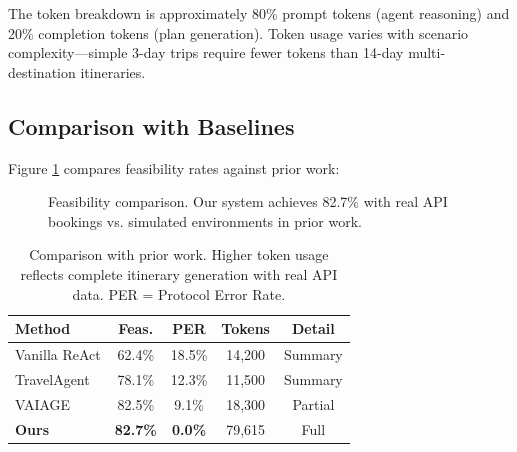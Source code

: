 \documentclass[conference]{IEEEtran}
\begin{document}
The token breakdown is approximately 80\% prompt tokens (agent reasoning) and 20\% completion tokens (plan generation). Token usage varies with scenario complexity---simple 3-day trips require fewer tokens than 14-day multi-destination itineraries.

\subsection{Comparison with Baselines}

Figure \ref{fig:feasibility} compares feasibility rates against prior work:

\begin{figure}[htbp]
    \centering
    \caption{Feasibility comparison. Our system achieves 82.7\% with real API bookings vs. simulated environments in prior work.}
    \label{fig:feasibility}
\end{figure}

\begin{table}[h]
\centering
\small
\begin{tabular}{lcccc}
\toprule
\textbf{Method} & \textbf{Feas.} & \textbf{PER} & \textbf{Tokens} & \textbf{Detail} \\
\midrule
Vanilla ReAct & 62.4\% & 18.5\% & 14,200 & Summary \\
TravelAgent & 78.1\% & 12.3\% & 11,500 & Summary \\
VAIAGE & 82.5\% & 9.1\% & 18,300 & Partial \\
\textbf{Ours} & \textbf{82.7\%} & \textbf{0.0\%} & 79,615 & Full \\
\bottomrule
\end{tabular}
\caption{Comparison with prior work. Higher token usage reflects complete itinerary generation with real API data. PER = Protocol Error Rate.}
\label{tab:baseline}
\end{table}
\end{document}
